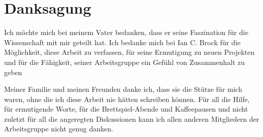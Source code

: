 \chapter*{Danksagung}
\label{sec:ack}

Ich möchte mich bei meinem Vater bedanken, dass er seine Faszination für die Wissenschaft mit mir geteilt hat.
Ich bedanke mich bei Ian {C.} Brock für die Möglichkeit, diese Arbeit zu verfassen, für seine Ermutigung zu neuen Projekten und für die Fähigkeit, seiner Arbeitsgruppe ein Gefühl von Zusammenhalt zu geben

Meiner Familie und meinen Freunden danke ich, dass sie die Stütze für mich waren, ohne die ich diese Arbeit nie hätten schreiben können.
Für all die Hilfe, für ermutigende Worte, für die Brettspiel-Abende und Kaffeepausen und nicht zuletzt für all die angeregten Diskussionen kann ich allen anderen Mitgliedern der Arbeitsgruppe nicht genug danken.


